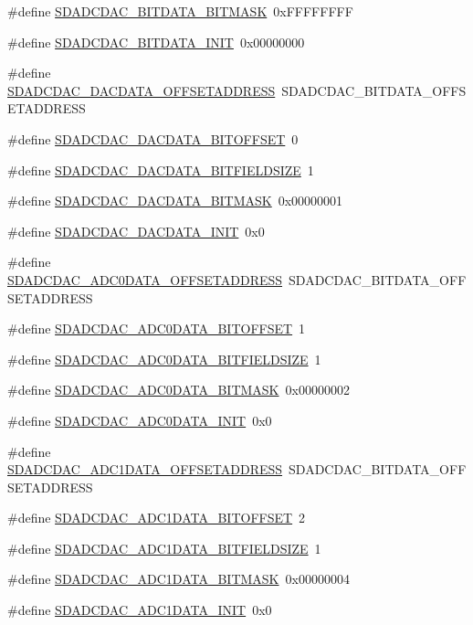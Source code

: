 \begin{DoxyCompactItemize}
\#define \hyperlink{a00569_a1b8716960dcaf0b06362a31d5cd20eb5}{SDADCDAC\_\-BITDATA\_\-BITMASK}~0xFFFFFFFF
\item 
\#define \hyperlink{a00569_a2177dd5cd4edabfc9202de5755d77b66}{SDADCDAC\_\-BITDATA\_\-INIT}~0x00000000
\item 
\#define \hyperlink{a00569_ae9389eab5332949be702af255b9d1766}{SDADCDAC\_\-DACDATA\_\-OFFSETADDRESS}~SDADCDAC\_\-BITDATA\_\-OFFSETADDRESS
\item 
\#define \hyperlink{a00569_a949cf4050d49f629c9dba32c2de18527}{SDADCDAC\_\-DACDATA\_\-BITOFFSET}~0
\item 
\#define \hyperlink{a00569_ab7346e10a5a23f70f511b8e31ad6ab52}{SDADCDAC\_\-DACDATA\_\-BITFIELDSIZE}~1
\item 
\#define \hyperlink{a00569_a13c375cd8751db96f464dcebcae5d43a}{SDADCDAC\_\-DACDATA\_\-BITMASK}~0x00000001
\item 
\#define \hyperlink{a00569_a6470b6c30c8c429a7014691c81f815ec}{SDADCDAC\_\-DACDATA\_\-INIT}~0x0
\item 
\#define \hyperlink{a00569_ab7a48c35a5d38298eb1368d18176e344}{SDADCDAC\_\-ADC0DATA\_\-OFFSETADDRESS}~SDADCDAC\_\-BITDATA\_\-OFFSETADDRESS
\item 
\#define \hyperlink{a00569_af3d9f61d4ff427f6354c200175fc3ddf}{SDADCDAC\_\-ADC0DATA\_\-BITOFFSET}~1
\item 
\#define \hyperlink{a00569_a6b411a55793125ab314ce87ffbc5b8ee}{SDADCDAC\_\-ADC0DATA\_\-BITFIELDSIZE}~1
\item 
\#define \hyperlink{a00569_af4eb25f29e21b082308e4b049b529571}{SDADCDAC\_\-ADC0DATA\_\-BITMASK}~0x00000002
\item 
\#define \hyperlink{a00569_a9fed8059a4b25f2c3d274965d55b8a6c}{SDADCDAC\_\-ADC0DATA\_\-INIT}~0x0
\item 
\#define \hyperlink{a00569_afcc42a9ccd72a26dccc0f171e946634a}{SDADCDAC\_\-ADC1DATA\_\-OFFSETADDRESS}~SDADCDAC\_\-BITDATA\_\-OFFSETADDRESS
\item 
\#define \hyperlink{a00569_ad4983a2a3589722cb2043b28033722a0}{SDADCDAC\_\-ADC1DATA\_\-BITOFFSET}~2
\item 
\#define \hyperlink{a00569_a76bf3ceb5e9cd6b2878335a47b6858c2}{SDADCDAC\_\-ADC1DATA\_\-BITFIELDSIZE}~1
\item 
\#define \hyperlink{a00569_a8ec00c86675b46657edf34897a6c7034}{SDADCDAC\_\-ADC1DATA\_\-BITMASK}~0x00000004
\item 
\#define \hyperlink{a00569_ab88a9f330a42c9b57a307102abd1cae6}{SDADCDAC\_\-ADC1DATA\_\-INIT}~0x0
\item 

\end{DoxyCompactItemize}

